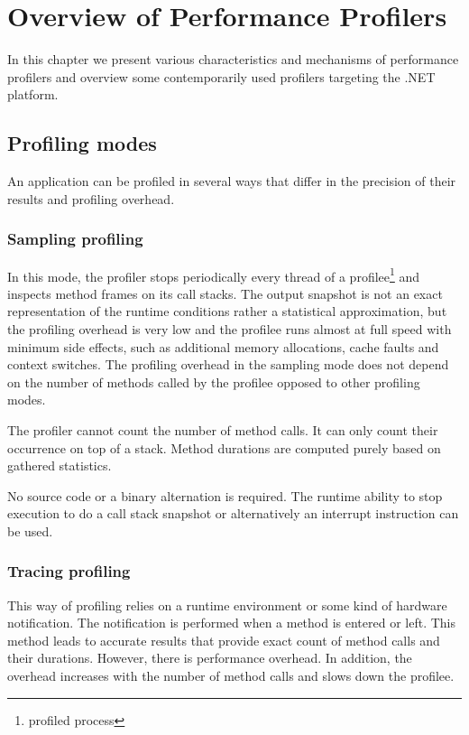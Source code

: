\chapter{Overview of Performance Profilers}

In this chapter we present various characteristics and mechanisms of performance profilers and overview some contemporarily used profilers targeting the .NET platform.

\label{01ProfModes}
\section{Profiling modes}
An application can be profiled in several ways that differ in the precision of their results and profiling overhead. 

\subsection{Sampling profiling}
In this mode, the profiler stops periodically every thread of a profilee\footnote{profiled process} and inspects method frames on its call stacks. The output snapshot is not an exact representation of the runtime conditions rather a statistical approximation, but the profiling overhead is very low and the profilee runs almost at full speed with minimum side effects, such as additional memory allocations, cache faults and context switches. The profiling overhead in the sampling mode does not depend on the number of methods called by the profilee opposed to other profiling modes. 

The profiler cannot count the number of method calls. It can only count their occurrence on top of a stack. Method durations are computed purely based on gathered statistics. 

No source code or a binary alternation is required. The runtime ability to stop execution to do a call stack snapshot or alternatively an interrupt instruction can be used.

\subsection{Tracing profiling}
This way of profiling relies on a runtime environment or some kind of hardware notification. The notification is performed when a method is entered or left. This method leads to accurate results that provide exact count of method calls and their durations. However, there is performance overhead. In addition, the overhead increases with the number of method calls and slows down the profilee.

